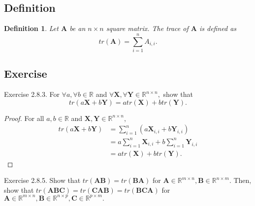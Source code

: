 \documentclass{article}
\theoremstyle{plain}
\newtheorem{dfn}{Definition}[subsection]
\begin{document}
\subsection{Definition}

\begin{dfn}
	Let $\bm{A}$ be an $n \times n$ square matrix. The trace of $\bm{A}$ is defined as
	\begin{equation}
		\label{trace}
		tr(\bm{A}) = \sum_{i=1}^n A_{i,i} .
	\end{equation}
\end{dfn}


\subsection{Exercise}

\begin{itembox}[l]{Exercise 2.8.3.}
	For
	\begin{math}
		\forall a , \forall b \in \mathbb{R}
	\end{math}
	and
	\begin{math}
		\forall \bm{X} , \forall \bm{Y} \in \mathbb{R}^{n \times n} ,
	\end{math}
	show that
	\begin{equation}
		tr(a \bm{X} + b \bm{Y}) = a tr(\bm{X}) + b tr(\bm{Y}) .
	\end{equation}
	
\end{itembox}

\begin{proof}
	For all $a, b \in \mathbb{R}$ and $\bm{X} , \bm{Y} \in \mathbb{R}^{n \times n} ,$
	\begin{equation*}
		\begin{split}
			tr(a \bm{X} + b \bm{Y}) &= \sum_{i=1}^n (a \bm{X}_{i,i} + b \bm{Y}_{i,i}) \\
			&= a \sum_{i=1}^n \bm{X}_{i,i} + b \sum_{i=1}^n \bm{Y}_{i,i} \\
			&= a tr(\bm{X}) + b tr(\bm{Y}) .
		\end{split}
	\end{equation*}
\end{proof}


\begin{itembox}[l]{Exercise 2.8.5.}
	Show that $tr(\bm{AB}) = tr(\bm{BA})$ for $\bm{A} \in \mathbb{R}^{m \times n} , \bm{B} \in \mathbb{R}^{n \times m} .$
	Then, show that $tr(\bm{ABC}) = tr(\bm{CAB}) = tr(\bm{BCA})$ for $\bm{A} \in \mathbb{R}^{m \times n} , \bm{B} \in \mathbb{R}^{n \times p} , \bm{C} \in \mathbb{R}^{p \times m} .$
\end{itembox}
\end{document}
